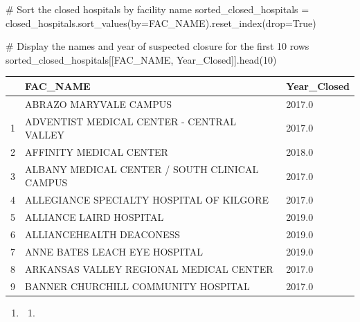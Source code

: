\documentclass[
  letterpaper,
  DIV=11,
  numbers=noendperiod]{scrartcl}
\newenvironment{Shaded}{\begin{snugshade}}{\end{snugshade}}
\newcommand{\CommentTok}[1]{\textcolor[rgb]{0.37,0.37,0.37}{#1}}
\newcommand{\DecValTok}[1]{\textcolor[rgb]{0.68,0.00,0.00}{#1}}
\newcommand{\NormalTok}[1]{\textcolor[rgb]{0.00,0.23,0.31}{#1}}
\newcommand{\OperatorTok}[1]{\textcolor[rgb]{0.37,0.37,0.37}{#1}}
\newcommand{\StringTok}[1]{\textcolor[rgb]{0.13,0.47,0.30}{#1}}
\newcommand{\VariableTok}[1]{\textcolor[rgb]{0.07,0.07,0.07}{#1}}
\providecommand{\tightlist}{%
  \setlength{\itemsep}{0pt}\setlength{\parskip}{0pt}}\usepackage{longtable,booktabs,array}
\begin{document}
\begin{Shaded}
\begin{Highlighting}[]
\CommentTok{\# Sort the closed hospitals by facility name}
\NormalTok{sorted\_closed\_hospitals }\OperatorTok{=}\NormalTok{ closed\_hospitals.sort\_values(by}\OperatorTok{=}\StringTok{\textquotesingle{}FAC\_NAME\textquotesingle{}}\NormalTok{).reset\_index(drop}\OperatorTok{=}\VariableTok{True}\NormalTok{)}

\CommentTok{\# Display the names and year of suspected closure for the first 10 rows}
\NormalTok{sorted\_closed\_hospitals[[}\StringTok{\textquotesingle{}FAC\_NAME\textquotesingle{}}\NormalTok{, }\StringTok{\textquotesingle{}Year\_Closed\textquotesingle{}}\NormalTok{]].head(}\DecValTok{10}\NormalTok{)}
\end{Highlighting}
\end{Shaded}

\begin{longtable}[]{@{}lll@{}}
\toprule\noalign{}
& FAC\_NAME & Year\_Closed \\
\midrule\noalign{}
\endhead
\bottomrule\noalign{}
\endlastfoot
0 & ABRAZO MARYVALE CAMPUS & 2017.0 \\
1 & ADVENTIST MEDICAL CENTER - CENTRAL VALLEY & 2017.0 \\
2 & AFFINITY MEDICAL CENTER & 2018.0 \\
3 & ALBANY MEDICAL CENTER / SOUTH CLINICAL CAMPUS & 2017.0 \\
4 & ALLEGIANCE SPECIALTY HOSPITAL OF KILGORE & 2017.0 \\
5 & ALLIANCE LAIRD HOSPITAL & 2019.0 \\
6 & ALLIANCEHEALTH DEACONESS & 2019.0 \\
7 & ANNE BATES LEACH EYE HOSPITAL & 2019.0 \\
8 & ARKANSAS VALLEY REGIONAL MEDICAL CENTER & 2017.0 \\
9 & BANNER CHURCHILL COMMUNITY HOSPITAL & 2017.0 \\
\end{longtable}

\begin{enumerate}
\def\labelenumi{\arabic{enumi}.}
\setcounter{enumi}{2}
\tightlist
\item
  \begin{enumerate}
  \def\labelenumii{\alph{enumii}.}
  \tightlist
  \item
  \end{enumerate}
\end{enumerate}
\end{document}
